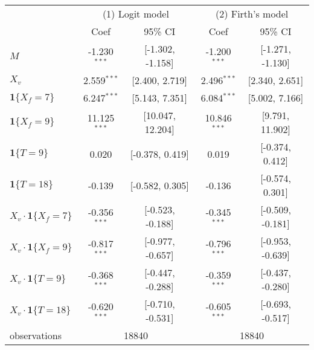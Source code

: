 \begin{tabular}{lcccc}
  \hline
   & \multicolumn{2}{c}{(1) Logit model} & \multicolumn{2}{c}{(2) Firth's model} \\ & Coef & 95\% CI & Coef & 95\% CI \\ \hline
$M$ & -1.230$^{***}$ & [-1.302, -1.158] & -1.200$^{***}$ & [-1.271, -1.130] \\ 
  $X_v$ & 2.559$^{***}$ & [2.400, 2.719] & 2.496$^{***}$ & [2.340, 2.651] \\ 
  $\textbf{1}\{X_f = 7\}$ & 6.247$^{***}$ & [5.143, 7.351] & 6.084$^{***}$ & [5.002, 7.166] \\ 
  $\textbf{1}\{X_f = 9\}$ & 11.125$^{***}$ & [10.047, 12.204] & 10.846$^{***}$ & [9.791, 11.902] \\ 
  $\textbf{1}\{T = 9\}$ & 0.020 & [-0.378, 0.419] & 0.019 & [-0.374, 0.412] \\ 
  $\textbf{1}\{T = 18\}$ & -0.139 & [-0.582, 0.305] & -0.136 & [-0.574, 0.301] \\ 
  $X_v\cdot\textbf{1}\{X_f = 7\}$ & -0.356$^{***}$ & [-0.523, -0.188] & -0.345$^{***}$ & [-0.509, -0.181] \\ 
  $X_v\cdot\textbf{1}\{X_f = 9\}$ & -0.817$^{***}$ & [-0.977, -0.657] & -0.796$^{***}$ & [-0.953, -0.639] \\ 
  $X_v\cdot\textbf{1}\{T = 9\}$ & -0.368$^{***}$ & [-0.447, -0.288] & -0.359$^{***}$ & [-0.437, -0.280] \\ 
  $X_v\cdot\textbf{1}\{T = 18\}$ & -0.620$^{***}$ & [-0.710, -0.531] & -0.605$^{***}$ & [-0.693, -0.517] \\ 
   \hline observations & \multicolumn{2}{c}{18840} & \multicolumn{2}{c}{18840} \\ \hline
\end{tabular}

